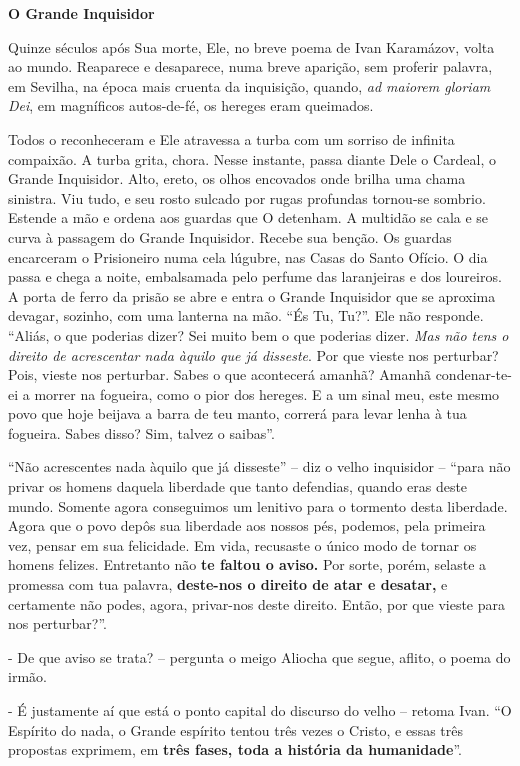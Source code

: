 \textbf{O Grande Inquisidor}

Quinze séculos após Sua morte, Ele, no breve poema de Ivan Karamázov,
volta ao mundo. Reaparece e desaparece, numa breve aparição, sem
proferir palavra, em Sevilha, na época mais cruenta da inquisição,
quando, \emph{ad maiorem gloriam Dei}, em magníficos autos-de-fé, os
hereges eram queimados.

Todos o reconheceram e Ele atravessa a turba com um sorriso de infinita
compaixão. A turba grita, chora. Nesse instante, passa diante Dele o
Cardeal, o Grande Inquisidor. Alto, ereto, os olhos encovados onde
brilha uma chama sinistra. Viu tudo, e seu rosto sulcado por rugas
profundas tornou-se sombrio. Estende a mão e ordena aos guardas que O
detenham. A multidão se cala e se curva à passagem do Grande Inquisidor.
Recebe sua benção. Os guardas encarceram o Prisioneiro numa cela
lúgubre, nas Casas do Santo Ofício. O dia passa e chega a noite,
embalsamada pelo perfume das laranjeiras e dos loureiros. A porta de
ferro da prisão se abre e entra o Grande Inquisidor que se aproxima
devagar, sozinho, com uma lanterna na mão. ``És Tu, Tu?''. Ele não
responde. ``Aliás, o que poderias dizer? Sei muito bem o que poderias
dizer. \emph{Mas não tens o direito de acrescentar nada àquilo que já
disseste}. Por que vieste nos perturbar? Pois, vieste nos perturbar.
Sabes o que acontecerá amanhã? Amanhã condenar-te-ei a morrer na
fogueira, como o pior dos hereges. E a um sinal meu, este mesmo povo que
hoje beijava a barra de teu manto, correrá para levar lenha à tua
fogueira. Sabes disso? Sim, talvez o saibas''.

``Não acrescentes nada àquilo que já disseste'' -- diz o velho
inquisidor -- ``para não privar os homens daquela liberdade que tanto
defendias, quando eras deste mundo. Somente agora conseguimos um
lenitivo para o tormento desta liberdade. Agora que o povo depôs sua
liberdade aos nossos pés, podemos, pela primeira vez, pensar em sua
felicidade. Em vida, recusaste o único modo de tornar os homens felizes.
Entretanto não \textbf{te faltou o aviso.} Por sorte, porém, selaste a
promessa com tua palavra, \textbf{deste-nos o direito de atar e
desatar,} e certamente não podes, agora, privar-nos deste direito.
Então, por que vieste para nos perturbar?''.

- De que aviso se trata? -- pergunta o meigo Aliocha que segue, aflito,
o poema do irmão.

- É justamente aí que está o ponto capital do discurso do velho --
retoma Ivan. ``O Espírito do nada, o Grande espírito tentou três vezes o
Cristo, e essas três propostas exprimem, em \textbf{três fases, toda a
história da humanidade}''.

